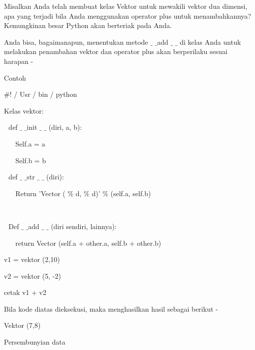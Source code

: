 \documentclass[a4paper,12pt]{report}
\begin{document}
\vspace{12pt}
\noindent 
Misalkan Anda telah membuat kelas Vektor untuk mewakili vektor dua dimensi, apa yang terjadi bila Anda menggunakan operator plus untuk menambahkannya? Kemungkinan besar Python akan berteriak pada Anda. \par
\vspace{12pt}
\noindent 
Anda bisa, bagaimanapun, menentukan metode  $  \_  $ $  \_  $add $  \_  $ $  \_  $ di kelas Anda untuk melakukan penambahan vektor dan operator plus akan berperilaku sesuai harapan - \par
\noindent 
Contoh \par
\vspace{12pt}
\noindent 
 $  \#  $! / Usr / bin / python \par
\vspace{12pt}
\noindent 
Kelas vektor: \par
\noindent 
 $  $ $  $ $  $def  $  \_  $ $  \_  $init  $  \_  $ $  \_  $ (diri, a, b): \par
\noindent 
 $  $ $  $ $  $ $  $ $  $ $  $Self.a = a \par
\noindent 
 $  $ $  $ $  $ $  $ $  $ $  $Self.b = b \par
\vspace{12pt}
\noindent 
 $  $ $  $ $  $def  $  \_  $ $  \_  $str  $  \_  $ $  \_  $ (diri): \par
\noindent 
 $  $ $  $ $  $ $  $ $  $ $  $Return 'Vector ( $  \%  $ d, $  \%  $ d)' $  \%  $ (self.a, self.b) \par
\noindent 
 $  $ $  $ $  $ \par
\noindent 
 $  $ $  $ $  $Def  $  \_  $ $  \_  $add  $  \_  $ $  \_  $ (diri sendiri, lainnya): \par
\noindent 
 $  $ $  $ $  $ $  $ $  $ $  $return Vector (self.a + other.a, self.b + other.b) \par
\vspace{12pt}
\noindent 
v1 = vektor (2,10) \par
\noindent 
v2 = vektor (5, -2) \par
\noindent 
cetak v1 + v2 \par
\vspace{12pt}
\noindent 
Bila kode diatas dieksekusi, maka menghasilkan hasil sebagai berikut - \par
\vspace{12pt}
\noindent 
Vektor (7,8) \par
\vspace{12pt}
\noindent 
Persembunyian data \par
\end{document}
